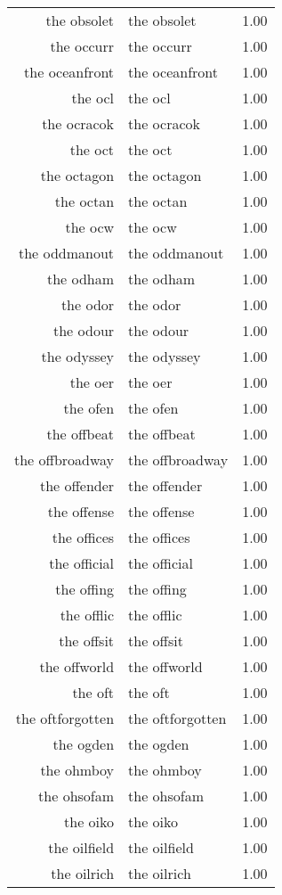 \begin{table}[ht]
\begin{tabular}{rlr}
  the obsolet & the obsolet & 1.00 \\ 
  the occurr & the occurr & 1.00 \\ 
  the oceanfront & the oceanfront & 1.00 \\ 
  the ocl & the ocl & 1.00 \\ 
  the ocracok & the ocracok & 1.00 \\ 
  the oct & the oct & 1.00 \\ 
  the octagon & the octagon & 1.00 \\ 
  the octan & the octan & 1.00 \\ 
  the ocw & the ocw & 1.00 \\ 
  the oddmanout & the oddmanout & 1.00 \\ 
  the odham & the odham & 1.00 \\ 
  the odor & the odor & 1.00 \\ 
  the odour & the odour & 1.00 \\ 
  the odyssey & the odyssey & 1.00 \\ 
  the oer & the oer & 1.00 \\ 
  the ofen & the ofen & 1.00 \\ 
  the offbeat & the offbeat & 1.00 \\ 
  the offbroadway & the offbroadway & 1.00 \\ 
  the offender & the offender & 1.00 \\ 
  the offense & the offense & 1.00 \\ 
  the offices & the offices & 1.00 \\ 
  the official & the official & 1.00 \\ 
  the offing & the offing & 1.00 \\ 
  the offlic & the offlic & 1.00 \\ 
  the offsit & the offsit & 1.00 \\ 
  the offworld & the offworld & 1.00 \\ 
  the oft & the oft & 1.00 \\ 
  the oftforgotten & the oftforgotten & 1.00 \\ 
  the ogden & the ogden & 1.00 \\ 
  the ohmboy & the ohmboy & 1.00 \\ 
  the ohsofam & the ohsofam & 1.00 \\ 
  the oiko & the oiko & 1.00 \\ 
  the oilfield & the oilfield & 1.00 \\ 
  the oilrich & the oilrich & 1.00 \\ 

\end{tabular}
\end{table}
